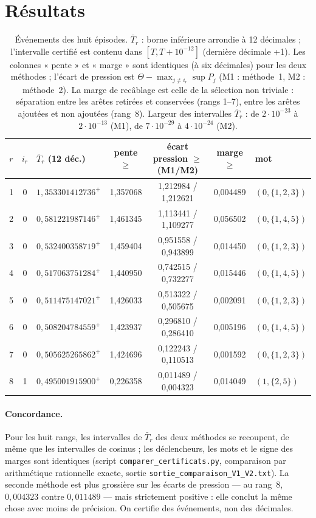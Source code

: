 \documentclass[11pt,a4paper]{article}
\theoremstyle{remark}
\begin{document}
\section{Résultats}\label{sec:resultats}
\begin{table}[h]
\centering\small
\begin{tabular}{@{}c c l c c c l@{}}
\toprule
$r$ & $i_r$ & $\bar T_r$ (12 déc.) & pente $\ge$ & écart pression $\ge$ (M1/M2) & marge $\ge$ & mot \\
\midrule
1 & 0 & $1{,}353301412736^{+}$ & 1,357068 & 1,212984 / 1,212621 & 0,004489 & $(0,\{1,2,3\})$\\
2 & 0 & $0{,}581221987146^{+}$ & 1,461345 & 1,113441 / 1,109277 & 0,056502 & $(0,\{1,4,5\})$\\
3 & 0 & $0{,}532400358719^{+}$ & 1,459404 & 0,951558 / 0,943899 & 0,014450 & $(0,\{1,2,3\})$\\
4 & 0 & $0{,}517063751284^{+}$ & 1,440950 & 0,742515 / 0,732277 & 0,015446 & $(0,\{1,4,5\})$\\
5 & 0 & $0{,}511475147021^{+}$ & 1,426033 & 0,513322 / 0,505675 & 0,002091 & $(0,\{1,2,3\})$\\
6 & 0 & $0{,}508204784559^{+}$ & 1,423937 & 0,296810 / 0,286410 & 0,005196 & $(0,\{1,4,5\})$\\
7 & 0 & $0{,}505625265862^{+}$ & 1,424696 & 0,122243 / 0,110513 & 0,001592 & $(0,\{1,2,3\})$\\
8 & 1 & $0{,}495001915900^{+}$ & 0,226358 & 0,011489 / 0,004323 & 0,014049 & $(1,\{2,5\})$\\
\bottomrule
\end{tabular}
\caption{Événements des huit épisodes. $\bar T_r$ : borne inférieure arrondie à 12 décimales ; l'intervalle certifié est contenu dans $[T,T+10^{-12}]$ (dernière décimale +1). Les colonnes « pente » et « marge » sont identiques (à six décimales) pour les deux méthodes ; l'écart de pression est $\Theta-\max_{j\ne i_r}\sup P_j$ (M1 : méthode~1, M2 : méthode~2). La marge de recâblage est celle de la sélection non triviale : séparation entre les arêtes retirées et conservées (rangs 1--7), entre les arêtes ajoutées et non ajoutées (rang~8). Largeur des intervalles $\bar T_r$ : de $2\cdot10^{-23}$ à $2\cdot10^{-13}$ (M1), de $7\cdot10^{-29}$ à $4\cdot10^{-24}$ (M2).}\label{tab:huit}
\end{table}

\paragraph{Concordance.} Pour les huit rangs, les intervalles de $\bar T_r$ des deux méthodes se recoupent, de même que les intervalles de cosinus ; les déclencheurs, les mots et le signe des marges sont identiques (script \texttt{comparer\_certificats.py}, comparaison par arithmétique rationnelle exacte, sortie \texttt{sortie\_comparaison\_V1\_V2.txt}). La seconde méthode est plus grossière sur les écarts de pression --- au rang~8, $0{,}004323$ contre $0{,}011489$ --- mais strictement positive : elle conclut la même chose avec moins de précision. On certifie des événements, non des décimales.
\end{document}

